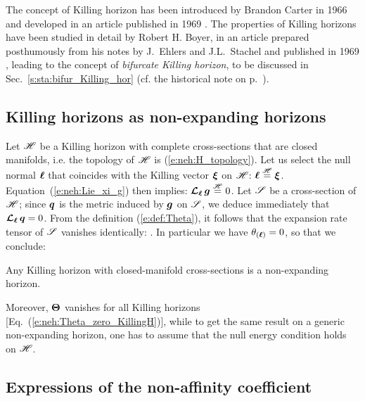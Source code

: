 \begin{hist}
The concept of Killing horizon has been introduced by Brandon Carter in
1966 \cite{Carte66,Carte67} and developed in an article published in
1969 \cite{Carte69}. The properties of Killing horizons have been
studied in detail by Robert H. Boyer,
in an article prepared posthumously from his notes
by J.~Ehlers and J.L.~Stachel and published in 1969 \cite{Boyer69},
leading to the concept of \emph{bifurcate Killing horizon}, to be discussed in
Sec.~\ref{s:sta:bifur_Killing_hor} (cf. the historical note on p.~\pageref{h:sta:Boyer}).
\end{hist}

\subsection{Killing horizons as non-expanding horizons}

Let $\mathscr{H}$ be a Killing horizon with complete cross-sections that are closed manifolds,
i.e. the topology of $\mathscr{H}$ is (\ref{e:neh:H_topology}). Let us select the null normal $\bm{\ell}$
that coincides with the Killing vector $\bm{\xi}$ on $\mathscr{H}$:
$\bm{\ell} \stackrel{\mathscr{H}}{=} \bm{\xi}$.
Equation~(\ref{e:neh:Lie_xi_g}) then implies: $\bm{\mathcal{L}}_{\bm{\ell}}\, \bm{g} \stackrel{\mathscr{H}}{=} 0$.
Let $\mathscr{S}$ be a cross-section of $\mathscr{H}$; since $\bm{q}$ is the metric induced by $\bm{g}$
on $\mathscr{S}$, we deduce immediately that
$\bm{\mathcal{L}}_{\bm{\ell}}\, \bm{q} = 0$.
From the definition (\ref{e:def:Theta}), it follows that the expansion rate
tensor of $\mathscr{S}$ vanishes identically:
\be \label{e:neh:Theta_zero_KillingH}
   .
\ee
In particular we have $\theta_{(\bm{\ell})} = 0$, so that we conclude:
\begin{prop}
Any Killing horizon with closed-manifold cross-sections is a non-expanding horizon.
\end{prop}
Moreover, $\bm{\Theta}$ vanishes
for all Killing horizons [Eq.~(\ref{e:neh:Theta_zero_KillingH})], while to get the same result on a generic non-expanding
horizon, one has to assume that the null energy condition holds on $\mathscr{H}$.

\subsection{Expressions of the non-affinity coefficient}

